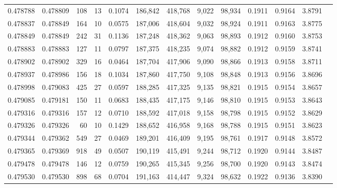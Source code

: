 \begin{tabular}{rrrrrrrrrrrrr}
0.478788 & 0.478809 &   108 &    13 &                                     0.1074 & 186,842 & 418,768 &   9,022 &  98,934 & 0.1911 & 0.9164 & 3.8791 \\
0.478837 & 0.478849 &   164 &    10 &                                     0.0575 & 187,006 & 418,604 &   9,032 &  98,924 & 0.1911 & 0.9163 & 3.8775 \\
0.478849 & 0.478849 &   242 &    31 &                                     0.1136 & 187,248 & 418,362 &   9,063 &  98,893 & 0.1912 & 0.9160 & 3.8753 \\
0.478883 & 0.478883 &   127 &    11 &                                     0.0797 & 187,375 & 418,235 &   9,074 &  98,882 & 0.1912 & 0.9159 & 3.8741 \\
0.478902 & 0.478902 &   329 &    16 &                                     0.0464 & 187,704 & 417,906 &   9,090 &  98,866 & 0.1913 & 0.9158 & 3.8711 \\
0.478937 & 0.478986 &   156 &    18 &                                     0.1034 & 187,860 & 417,750 &   9,108 &  98,848 & 0.1913 & 0.9156 & 3.8696 \\
0.478998 & 0.479083 &   425 &    27 &                                     0.0597 & 188,285 & 417,325 &   9,135 &  98,821 & 0.1915 & 0.9154 & 3.8657 \\
0.479085 & 0.479181 &   150 &    11 &                                     0.0683 & 188,435 & 417,175 &   9,146 &  98,810 & 0.1915 & 0.9153 & 3.8643 \\
0.479316 & 0.479316 &   157 &    12 &                                     0.0710 & 188,592 & 417,018 &   9,158 &  98,798 & 0.1915 & 0.9152 & 3.8629 \\
0.479326 & 0.479326 &    60 &    10 &                                     0.1429 & 188,652 & 416,958 &   9,168 &  98,788 & 0.1915 & 0.9151 & 3.8623 \\
0.479344 & 0.479362 &   549 &    27 &                                     0.0469 & 189,201 & 416,409 &   9,195 &  98,761 & 0.1917 & 0.9148 & 3.8572 \\
0.479365 & 0.479369 &   918 &    49 &                                     0.0507 & 190,119 & 415,491 &   9,244 &  98,712 & 0.1920 & 0.9144 & 3.8487 \\
0.479478 & 0.479478 &   146 &    12 &                                     0.0759 & 190,265 & 415,345 &   9,256 &  98,700 & 0.1920 & 0.9143 & 3.8474 \\
0.479530 & 0.479530 &   898 &    68 &                                     0.0704 & 191,163 & 414,447 &   9,324 &  98,632 & 0.1922 & 0.9136 & 3.8390 \\

\end{tabular}
